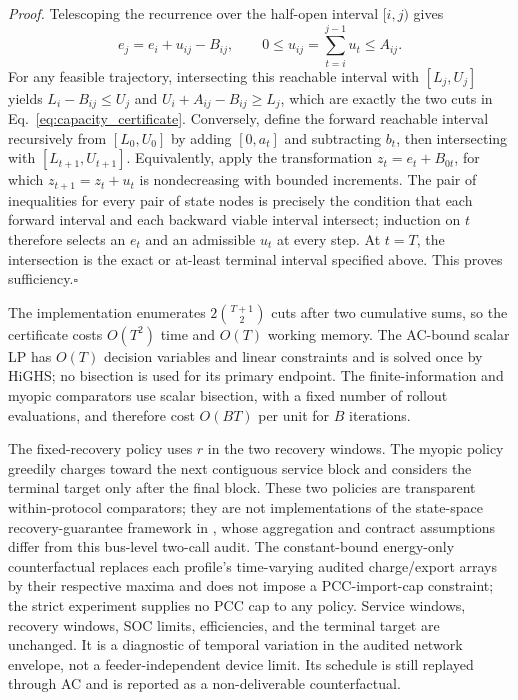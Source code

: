 \documentclass[11pt]{article}
\begin{document}
\emph{Proof.} Telescoping the recurrence over the half-open interval $[i,j)$ gives
\[
 e_j=e_i+u_{ij}-B_{ij},\qquad 0\leq u_{ij}=\sum_{t=i}^{j-1}u_t\leq A_{ij}.
\]
For any feasible trajectory, intersecting this reachable interval with $[L_j,U_j]$ yields $L_i-B_{ij}\leq U_j$ and $U_i+A_{ij}-B_{ij}\geq L_j$, which are exactly the two cuts in Eq.~\eqref{eq:capacity_certificate}. Conversely, define the forward reachable interval recursively from $[L_0,U_0]$ by adding $[0,a_t]$ and subtracting $b_t$, then intersecting with $[L_{t+1},U_{t+1}]$. Equivalently, apply the transformation $z_t=e_t+B_{0t}$, for which $z_{t+1}=z_t+u_t$ is nondecreasing with bounded increments. The pair of inequalities for every pair of state nodes is precisely the condition that each forward interval and each backward viable interval intersect; induction on $t$ therefore selects an $e_t$ and an admissible $u_t$ at every step. At $t=T$, the intersection is the exact or at-least terminal interval specified above. This proves sufficiency.\hfill$\square$

The implementation enumerates $2\binom{T+1}{2}$ cuts after two cumulative sums, so the certificate costs $O(T^2)$ time and $O(T)$ working memory. The AC-bound scalar LP has $O(T)$ decision variables and linear constraints and is solved once by HiGHS; no bisection is used for its primary endpoint. The finite-information and myopic comparators use scalar bisection, with a fixed number of rollout evaluations, and therefore cost $O(BT)$ per unit for $B$ iterations.

The fixed-recovery policy uses $r$ in the two recovery windows. The myopic policy greedily charges toward the next contiguous service block and considers the terminal target only after the final block. These two policies are transparent within-protocol comparators; they are not implementations of the state-space recovery-guarantee framework in \cite{Evans2022Recovery}, whose aggregation and contract assumptions differ from this bus-level two-call audit. The constant-bound energy-only counterfactual replaces each profile's time-varying audited charge/export arrays by their respective maxima and does not impose a PCC-import-cap constraint; the strict experiment supplies no PCC cap to any policy. Service windows, recovery windows, SOC limits, efficiencies, and the terminal target are unchanged. It is a diagnostic of temporal variation in the audited network envelope, not a feeder-independent device limit. Its schedule is still replayed through AC and is reported as a non-deliverable counterfactual.
\end{document}

